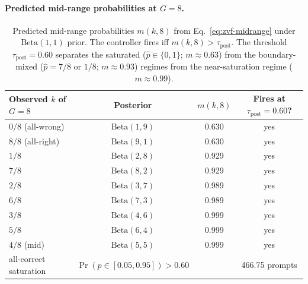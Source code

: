 \paragraph{Predicted mid-range probabilities at $G{=}8$.}
\begin{table}[t]
\centering
\caption{Predicted mid-range probabilities $m(k,8)$ from
Eq.~\eqref{eq:zvf-midrange} under $\mathrm{Beta}(1,1)$ prior. The
controller fires iff $m(k,8) > \tau_{\mathrm{post}}$. The threshold
$\tau_{\mathrm{post}}{=}0.60$ separates the saturated
($\hat p \in \{0,1\}$; $m \approx 0.63$) from the boundary-mixed
($\hat p = 7/8$ or $1/8$; $m \approx 0.93$) regimes from the
near-saturation regime ($m \approx 0.99$).}
\label{tab:p7-bayesian-mid}
\begin{tabular}{lccc}
\toprule
Observed $k$ of $G{=}8$ & Posterior & $m(k, 8)$ & Fires at $\tau_{\mathrm{post}}{=}0.60$? \\
\midrule
$0/8$  (all-wrong)  & $\mathrm{Beta}(1, 9)$   & 0.630 & yes \\
$8/8$  (all-right)  & $\mathrm{Beta}(9, 1)$   & 0.630 & yes \\
$1/8$               & $\mathrm{Beta}(2, 8)$   & 0.929 & yes \\
$7/8$               & $\mathrm{Beta}(8, 2)$   & 0.929 & yes \\
$2/8$               & $\mathrm{Beta}(3, 7)$   & 0.989 & yes \\
$6/8$               & $\mathrm{Beta}(7, 3)$   & 0.989 & yes \\
$3/8$               & $\mathrm{Beta}(4, 6)$   & 0.999 & yes \\
$5/8$               & $\mathrm{Beta}(6, 4)$   & 0.999 & yes \\
$4/8$  (mid)        & $\mathrm{Beta}(5, 5)$   & 0.999 & yes \\
\midrule
all-correct saturation & $\Pr(p \in [0.05, 0.95]) > 0.60$ &  & 466.75 prompts \\
\bottomrule
\end{tabular}
\end{table}

